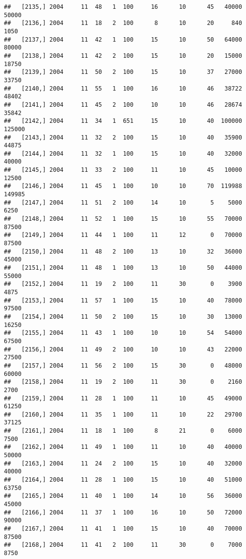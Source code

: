 \documentclass{article}\usepackage[]{graphicx}\usepackage[]{color}
\makeatletter
\newenvironment{kframe}{%
 \def\at@end@of@kframe{}%
 \ifinner\ifhmode%
  \def\at@end@of@kframe{\end{minipage}}%
  \begin{minipage}{\columnwidth}%
 \fi\fi%
 \def\FrameCommand##1{\hskip\@totalleftmargin \hskip-\fboxsep
 \colorbox{shadecolor}{##1}\hskip-\fboxsep
     \hskip-\linewidth \hskip-\@totalleftmargin \hskip\columnwidth}%
 \MakeFramed {\advance\hsize-\width
   \@totalleftmargin\z@ \linewidth\hsize
   \@setminipage}}%
 {\par\unskip\endMakeFramed%
 \at@end@of@kframe}
\newenvironment{knitrout}{}{} %
\makeatother
\begin{document}
\begin{knitrout}
\begin{kframe}
\begin{verbatim}
##   [2135,] 2004     11  48   1  100     16      10      45   40000   50000
##   [2136,] 2004     11  18   2  100      8      10      20     840    1050
##   [2137,] 2004     11  42   1  100     15      10      50   64000   80000
##   [2138,] 2004     11  42   2  100     15      10      20   15000   18750
##   [2139,] 2004     11  50   2  100     15      10      37   27000   33750
##   [2140,] 2004     11  55   1  100     16      10      46   38722   48402
##   [2141,] 2004     11  45   2  100     10      10      46   28674   35842
##   [2142,] 2004     11  34   1  651     15      10      40  100000  125000
##   [2143,] 2004     11  32   2  100     15      10      40   35900   44875
##   [2144,] 2004     11  32   1  100     15      10      40   32000   40000
##   [2145,] 2004     11  33   2  100     11      10      45   10000   12500
##   [2146,] 2004     11  45   1  100     10      10      70  119988  149985
##   [2147,] 2004     11  51   2  100     14      10       5    5000    6250
##   [2148,] 2004     11  52   1  100     15      10      55   70000   87500
##   [2149,] 2004     11  44   1  100     11      12       0   70000   87500
##   [2150,] 2004     11  48   2  100     13      10      32   36000   45000
##   [2151,] 2004     11  48   1  100     13      10      50   44000   55000
##   [2152,] 2004     11  19   2  100     11      30       0    3900    4875
##   [2153,] 2004     11  57   1  100     15      10      40   78000   97500
##   [2154,] 2004     11  50   2  100     15      10      30   13000   16250
##   [2155,] 2004     11  43   1  100     10      10      54   54000   67500
##   [2156,] 2004     11  49   2  100     10      10      43   22000   27500
##   [2157,] 2004     11  56   2  100     15      30       0   48000   60000
##   [2158,] 2004     11  19   2  100     11      30       0    2160    2700
##   [2159,] 2004     11  28   1  100     11      10      45   49000   61250
##   [2160,] 2004     11  35   1  100     11      10      22   29700   37125
##   [2161,] 2004     11  18   1  100      8      21       0    6000    7500
##   [2162,] 2004     11  49   1  100     11      10      40   40000   50000
##   [2163,] 2004     11  24   2  100     15      10      40   32000   40000
##   [2164,] 2004     11  28   1  100     15      10      40   51000   63750
##   [2165,] 2004     11  40   1  100     14      10      56   36000   45000
##   [2166,] 2004     11  37   1  100     16      10      50   72000   90000
##   [2167,] 2004     11  41   1  100     15      10      40   70000   87500
##   [2168,] 2004     11  41   2  100     11      30       0    7000    8750

\end{verbatim}
\end{kframe}
\end{knitrout}
\end{document}
